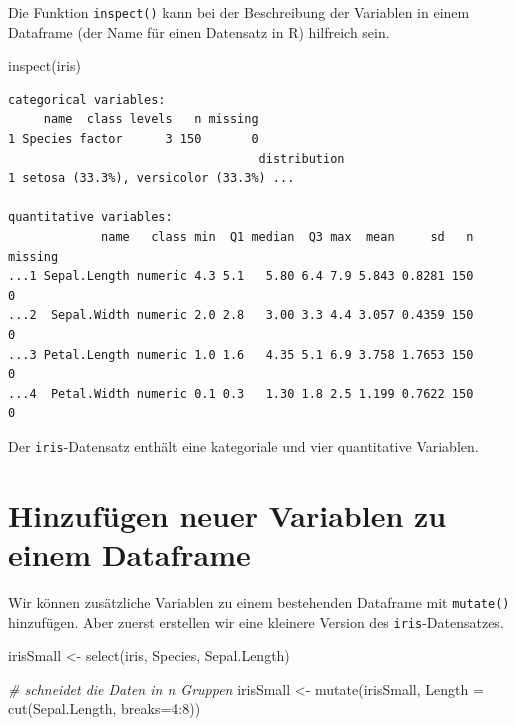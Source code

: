 \documentclass[
  ngerman,
]{scrbook}
\newenvironment{Shaded}{\begin{snugshade}}{\end{snugshade}}
\newcommand{\AttributeTok}[1]{\textcolor[rgb]{0.77,0.63,0.00}{#1}}
\newcommand{\CommentTok}[1]{\textcolor[rgb]{0.56,0.35,0.01}{\textit{#1}}}
\newcommand{\DecValTok}[1]{\textcolor[rgb]{0.00,0.00,0.81}{#1}}
\newcommand{\FunctionTok}[1]{\textcolor[rgb]{0.00,0.00,0.00}{#1}}
\newcommand{\NormalTok}[1]{#1}
\newcommand{\OtherTok}[1]{\textcolor[rgb]{0.56,0.35,0.01}{#1}}
\newcommand{\SpecialCharTok}[1]{\textcolor[rgb]{0.00,0.00,0.00}{#1}}
\begin{document}
Die Funktion \texttt{inspect()} kann bei der Beschreibung der Variablen in einem Dataframe (der Name für einen Datensatz in \textsf{R}) hilfreich sein.

\begin{Shaded}
\begin{Highlighting}[]
\FunctionTok{inspect}\NormalTok{(iris)}
\end{Highlighting}
\end{Shaded}

\begin{verbatim}
categorical variables:  
     name  class levels   n missing
1 Species factor      3 150       0
                                   distribution
1 setosa (33.3%), versicolor (33.3%) ...       

quantitative variables:  
             name   class min  Q1 median  Q3 max  mean     sd   n missing
...1 Sepal.Length numeric 4.3 5.1   5.80 6.4 7.9 5.843 0.8281 150       0
...2  Sepal.Width numeric 2.0 2.8   3.00 3.3 4.4 3.057 0.4359 150       0
...3 Petal.Length numeric 1.0 1.6   4.35 5.1 6.9 3.758 1.7653 150       0
...4  Petal.Width numeric 0.1 0.3   1.30 1.8 2.5 1.199 0.7622 150       0
\end{verbatim}

Der \texttt{iris}-Datensatz enthält eine kategoriale und vier quantitative Variablen.

\hypertarget{hinzufuxfcgen-neuer-variablen-zu-einem-dataframe}{%
\section{Hinzufügen neuer Variablen zu einem Dataframe}\label{hinzufuxfcgen-neuer-variablen-zu-einem-dataframe}}

Wir können zusätzliche Variablen zu einem bestehenden Dataframe mit \texttt{mutate()} hinzufügen. Aber zuerst erstellen wir eine kleinere Version des \texttt{iris}-Datensatzes.

\begin{Shaded}
\begin{Highlighting}[]
\NormalTok{irisSmall }\OtherTok{\textless{}{-}} \FunctionTok{select}\NormalTok{(iris, Species, Sepal.Length)}
\end{Highlighting}
\end{Shaded}

\begin{Shaded}
\begin{Highlighting}[]
\CommentTok{\# schneidet die Daten in n Gruppen}
\NormalTok{irisSmall }\OtherTok{\textless{}{-}} \FunctionTok{mutate}\NormalTok{(irisSmall, }\AttributeTok{Length =} \FunctionTok{cut}\NormalTok{(Sepal.Length, }\AttributeTok{breaks=}\DecValTok{4}\SpecialCharTok{:}\DecValTok{8}\NormalTok{))}
\end{Highlighting}
\end{Shaded}
\end{document}
